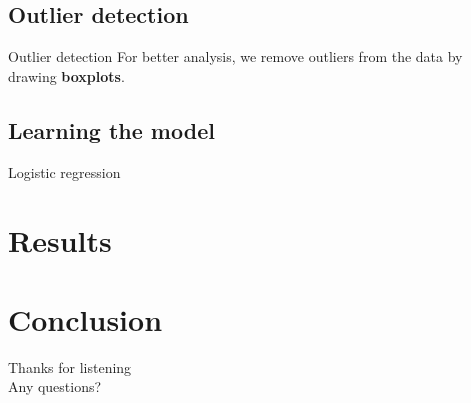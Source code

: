\documentclass[nonav,sleutel]{beamer}
\begin{document}
\subsection{Outlier detection}
\begin{frame}{Outlier detection}
For better analysis, we remove outliers from the data by drawing \textbf{boxplots}.
\end{frame}


\subsection{Learning the model}

\begin{frame}{Logistic regression}
	
\end{frame}

\section{Results}

\section{Conclusion}
\begin{frame}
\begin{center}
\Large{Thanks for listening}\\
Any questions?
\end{center}

\end{frame}
\end{document}
